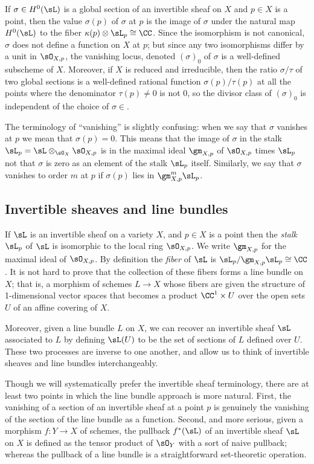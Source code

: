 If $\sigma\in H^0(\sL)$ is a global section of an invertible sheaf on $X$ and $p\in X$ is a point, then the value $\sigma(p)$ of $\sigma$ at $p$ is the image  of $\sigma$ under the natural map $H^0(\sL)$ to the fiber $\kappa(p) \otimes \sL_{p} \cong \CC$.
Since the isomorphism is not canonical, $\sigma$ does not define a function on $X$ at $p$; but since any two isomorphisms
differ by a unit in $\sO_{X,p}$, the vanishing locus, denoted $(\sigma)_0$ of $\sigma$ is a well-defined subscheme of $X$. Moreover, if $X$ is reduced and irreducible, then the ratio $\sigma/\tau$ of two global sections is a well-defined rational function
$\sigma(p)/\tau(p)$ at all the points where the denominator $\tau(p)\neq 0$ is not 0, so the divisor class of 
$(\sigma)_0$ is independent of the choice of $\sigma \in $.

The terminology of ``vanishing'' is slightly confusing: when we  say that $\sigma$ vanishes at $p$ we mean
that $\sigma(p) = 0$. This means that the image of $\sigma$ in the stalk $\sL_p = \sL \otimes_{\sO_{X}} \sO_{X,p}$ is in 
the maximal ideal $\gm_{X,p}$ of $\sO_{X,p}$ times $\sL_p$
not that $\sigma$ is zero
as an element of the stalk $\sL_p$ itself. Similarly, we say that $\sigma$ vanishes to order $m$ at $p$ if $\sigma(p)$ lies in $\gm_{X,p}^m\sL_p$. 

\subsection{Invertible sheaves and line bundles}

If $\sL$ is an invertible sheaf on a variety $X$, and $p\in X$ is a point then the \emph{stalk} $\sL_p$ of $\sL$ is isomorphic to the local
ring $\sO_{X,p}$. We write $\gm_{X,p}$ for the maximal ideal of $\sO_{X,p}$. By definition the \emph{fiber} of $\sL$ is 
$\sL_p/\gm_{X,p}\sL_p\cong \CC$. It is not hard to prove that the collection of these fibers forms a line bundle on $X$; that is,
a morphism of schemes $L \to X$ whose fibers are given the structure of 1-dimensional vector spaces that becomes
a product $\CC^1 \times U$ over the open sets $U$ of an affine covering of $X$.

Moreover,
given a line bundle $L$ on $X$, we can recover an invertible sheaf $\sL$ associated to $L$ by defining
$\sL(U)$ to be the set of sections of $L$ defined over $U$. These two processes are inverse to one another, and allow
us to think of invertible sheaves and line bundles interchangeably.

Though we will systematically prefer the invertible sheaf terminology, there are at least two points in which the line bundle approach is more natural. First,  the vanishing of a section of an invertible sheaf at a point $p$ is genuinely the vanishing of the 
section of the line bundle as a function. Second, and more serious, given a morphism $f: Y\to X$ of schemes, the 
pullback $f^*(\sL)$ of an invertible sheaf $\sL$ on $X$ is defined as the tensor product of $\sO_Y$ with a sort of naive pullback; whereas the pullback of a line bundle is a straightforward set-theoretic operation.

